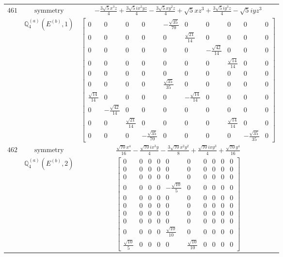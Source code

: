 \documentclass[fleqn,8pt,landscape]{jsarticle}
\begin{document}
\begin{longtable}{ccc}
$ 461 $ & $ \text{symmetry} $ & $ - \frac{3 \sqrt{5} x^{3} z}{4} + \frac{3 \sqrt{5} i x^{2} y z}{4} - \frac{3 \sqrt{5} x y^{2} z}{4} + \sqrt{5} x z^{3} + \frac{3 \sqrt{5} i y^{3} z}{4} - \sqrt{5} i y z^{3} $ \\
$  $ & $ \mathbb{Q}_{4}^{(a)}(E^{(b)},1) $ & $ \begin{bmatrix} 0 & 0 & 0 & 0 & - \frac{\sqrt{35}}{70} & 0 & 0 & 0 & 0 & 0 \\ 0 & 0 & 0 & 0 & 0 & \frac{\sqrt{21}}{14} & 0 & 0 & 0 & 0 \\ 0 & 0 & 0 & 0 & 0 & 0 & - \frac{\sqrt{42}}{14} & 0 & 0 & 0 \\ 0 & 0 & 0 & 0 & 0 & 0 & 0 & \frac{\sqrt{14}}{14} & 0 & 0 \\ 0 & 0 & 0 & 0 & 0 & 0 & 0 & 0 & 0 & 0 \\ 0 & 0 & 0 & 0 & \frac{\sqrt{35}}{35} & 0 & 0 & 0 & 0 & 0 \\ \frac{\sqrt{14}}{14} & 0 & 0 & 0 & 0 & - \frac{\sqrt{14}}{14} & 0 & 0 & 0 & 0 \\ 0 & - \frac{\sqrt{42}}{14} & 0 & 0 & 0 & 0 & 0 & 0 & 0 & 0 \\ 0 & 0 & \frac{\sqrt{21}}{14} & 0 & 0 & 0 & 0 & \frac{\sqrt{14}}{14} & 0 & 0 \\ 0 & 0 & 0 & - \frac{\sqrt{35}}{70} & 0 & 0 & 0 & 0 & - \frac{\sqrt{35}}{35} & 0 \end{bmatrix} $ \\ \hline
$ 462 $ & $ \text{symmetry} $ & $ \frac{\sqrt{70} x^{4}}{16} - \frac{\sqrt{70} i x^{3} y}{4} - \frac{3 \sqrt{70} x^{2} y^{2}}{8} + \frac{\sqrt{70} i x y^{3}}{4} + \frac{\sqrt{70} y^{4}}{16} $ \\
$  $ & $ \mathbb{Q}_{4}^{(a)}(E^{(b)},2) $ & $ \begin{bmatrix} 0 & 0 & 0 & 0 & 0 & 0 & 0 & 0 & 0 & 0 \\ 0 & 0 & 0 & 0 & 0 & 0 & 0 & 0 & 0 & 0 \\ 0 & 0 & 0 & 0 & 0 & 0 & 0 & 0 & 0 & 0 \\ 0 & 0 & 0 & 0 & - \frac{\sqrt{10}}{5} & 0 & 0 & 0 & 0 & 0 \\ 0 & 0 & 0 & 0 & 0 & 0 & 0 & 0 & 0 & 0 \\ 0 & 0 & 0 & 0 & 0 & 0 & 0 & 0 & 0 & 0 \\ 0 & 0 & 0 & 0 & 0 & 0 & 0 & 0 & 0 & 0 \\ 0 & 0 & 0 & 0 & 0 & 0 & 0 & 0 & 0 & 0 \\ 0 & 0 & 0 & 0 & \frac{\sqrt{10}}{10} & 0 & 0 & 0 & 0 & 0 \\ \frac{\sqrt{10}}{5} & 0 & 0 & 0 & 0 & \frac{\sqrt{10}}{10} & 0 & 0 & 0 & 0 \end{bmatrix} $ \\ \hline

\end{longtable}
\end{document}
